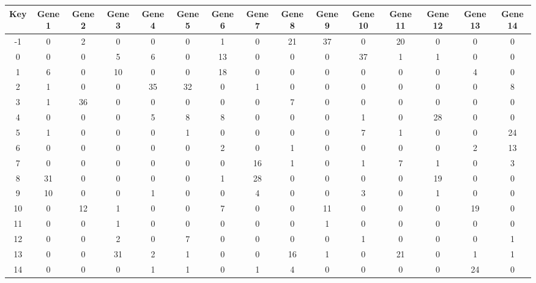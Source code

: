 \begin{tabular}{|c|c|c|c|c|c|c|c|c|c|c|c|c|c|c|}
\hline
Key & Gene 1 & Gene 2 & Gene 3 & Gene 4 & Gene 5 & Gene 6 & Gene 7 & Gene 8 & Gene 9 & Gene 10 & Gene 11 & Gene 12 & Gene 13 & Gene 14 \\
\hline
-1 & 0 & 2 & 0 & 0 & 0 & 1 & 0 & 21 & 37 & 0 & 20 & 0 & 0 & 0 \\
0 & 0 & 0 & 5 & 6 & 0 & 13 & 0 & 0 & 0 & 37 & 1 & 1 & 0 & 0 \\
1 & 6 & 0 & 10 & 0 & 0 & 18 & 0 & 0 & 0 & 0 & 0 & 0 & 4 & 0 \\
2 & 1 & 0 & 0 & 35 & 32 & 0 & 1 & 0 & 0 & 0 & 0 & 0 & 0 & 8 \\
3 & 1 & 36 & 0 & 0 & 0 & 0 & 0 & 7 & 0 & 0 & 0 & 0 & 0 & 0 \\
4 & 0 & 0 & 0 & 5 & 8 & 8 & 0 & 0 & 0 & 1 & 0 & 28 & 0 & 0 \\
5 & 1 & 0 & 0 & 0 & 1 & 0 & 0 & 0 & 0 & 7 & 1 & 0 & 0 & 24 \\
6 & 0 & 0 & 0 & 0 & 0 & 2 & 0 & 1 & 0 & 0 & 0 & 0 & 2 & 13 \\
7 & 0 & 0 & 0 & 0 & 0 & 0 & 16 & 1 & 0 & 1 & 7 & 1 & 0 & 3 \\
8 & 31 & 0 & 0 & 0 & 0 & 1 & 28 & 0 & 0 & 0 & 0 & 19 & 0 & 0 \\
9 & 10 & 0 & 0 & 1 & 0 & 0 & 4 & 0 & 0 & 3 & 0 & 1 & 0 & 0 \\
10 & 0 & 12 & 1 & 0 & 0 & 7 & 0 & 0 & 11 & 0 & 0 & 0 & 19 & 0 \\
11 & 0 & 0 & 1 & 0 & 0 & 0 & 0 & 0 & 1 & 0 & 0 & 0 & 0 & 0 \\
12 & 0 & 0 & 2 & 0 & 7 & 0 & 0 & 0 & 0 & 1 & 0 & 0 & 0 & 1 \\
13 & 0 & 0 & 31 & 2 & 1 & 0 & 0 & 16 & 1 & 0 & 21 & 0 & 1 & 1 \\
14 & 0 & 0 & 0 & 1 & 1 & 0 & 1 & 4 & 0 & 0 & 0 & 0 & 24 & 0 \\
\hline
\end{tabular}